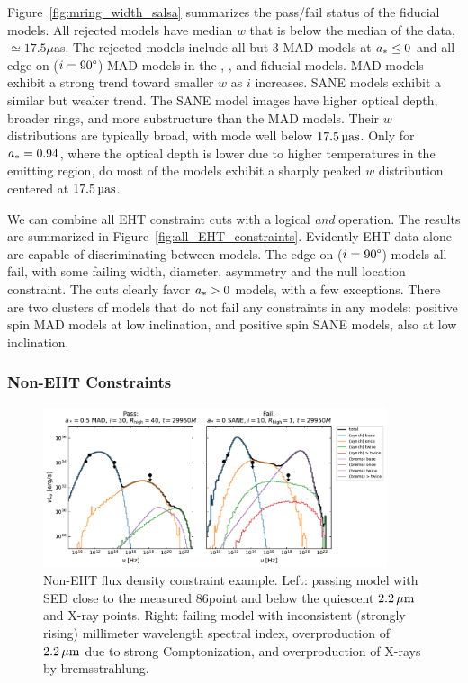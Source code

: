 Figure~\ref{fig:mring_width_salsa} summarizes the \mring  pass/fail status of the fiducial models.
All rejected models have median $w$ that is below the median of the data, $ \simeq 17.5\mu$as.
The rejected models include all but 3 MAD models at $a_* \le 0$ and all edge-on ($i = 90\degree$) MAD models in the  \kharma, \bhac, and \hamr fiducial models.
MAD models exhibit a strong trend toward smaller $w$ as $i$ increases.
SANE models exhibit a similar but weaker trend.
The SANE model images have  higher optical depth, broader rings, and more substructure than the MAD models.
Their $w$ distributions are typically broad, with mode well below $17.5\uas$.
Only for $a_* = 0.94$, where the optical depth is lower due to higher temperatures in the emitting region, do most of the models exhibit a sharply peaked $w$ distribution centered at $17.5\uas$.


We can combine all EHT constraint cuts with a logical {\em and} operation.
The results are summarized in Figure~\ref{fig:all_EHT_constraints}.
Evidently EHT data alone are capable of discriminating between models.
The edge-on ($i = 90\degree$) models all fail, with some failing \mring width, diameter, asymmetry and the null location constraint.
The cuts clearly favor $a_* > 0$ models, with a few exceptions.
There are two clusters of models that do not fail any constraints in any models: positive spin MAD models at low inclination, and positive spin SANE models, also at low inclination.

\subsubsection{Non-EHT Constraints}

\begin{figure}[h!]
  \centering
  \includegraphics[width=0.9\textwidth]{figures/passfail_sed.pdf}
  \caption{%
    Non-EHT flux density constraint example.
    Left: passing model with SED close to the measured 86\GHz point and below the quiescent $2.2\,\mu\mathrm{m}$ and X-ray points.
    Right: failing model with inconsistent (strongly rising) millimeter wavelength spectral index, overproduction of $2.2\,\mu\mathrm{m}$ due to strong Comptonization, and overproduction of X-rays by bremsstrahlung.}
  \label{fig:passfail_sed}
\end{figure}

